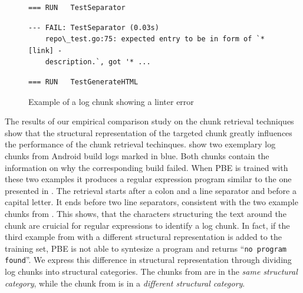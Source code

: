 \begin{figure}[!t]
  \centering
  \begin{lstlisting}[breaklines=true,frame=tlr]
=== RUN   TestSeparator
  \end{lstlisting}
  \vspace{-\baselineskip}
  \begin{lstlisting}[backgroundcolor=\color{Cerulean!60},breaklines=true,frame=rl]
--- FAIL: TestSeparator (0.03s)
    repo\_test.go:75: expected entry to be in form of `* [link] -
    description.`, got '* ...
  \end{lstlisting}
  \vspace{-\baselineskip}
  \begin{lstlisting}[breaklines=true,frame=blr]
=== RUN   TestGenerateHTML
  \end{lstlisting}
  \caption{Example of a log chunk showing a linter error}
  \label{lst:chunk-example-3}
\end{figure}

The results of our empirical comparison study on the chunk retrieval
techniques
show that the structural representation of the targeted chunk greatly
influences
the performance of the chunk retrieval techinques.
 show two exemplary
log chunks from Android build logs marked in blue.
Both chunks contain the information on why the
corresponding build failed.
When PBE is trained with these two examples it produces
a regular expression program similar to the one presented in
.
The retrieval
starts after a colon and a line separator and before a capital
letter.
It ends before two line separators, consistent with the two example
chunks from .
This shows, that the characters structuring the text around the chunk are
cruicial for regular expressions to identify a log chunk.
In fact, if the third example from  with a
different structural representation is added to the training set,
PBE is not able to syntesize a program and returns
``\texttt{no program found}''.
We express this difference in structural representation through
dividing log chunks into structural categories.
The chunks from 
are in the \emph{same structural category}, while the chunk from
 is in a \emph{different structural category}.


